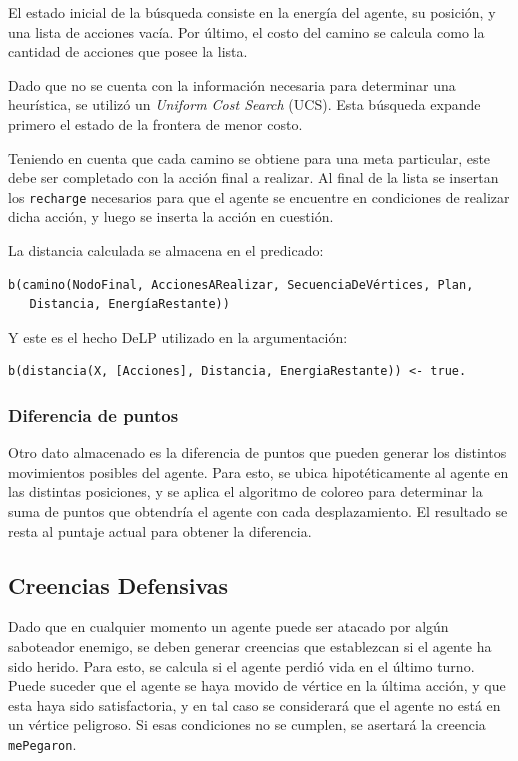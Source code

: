 \documentclass[oneside]{book}
\theoremstyle{definition}
\theoremstyle{example}
\begin{document}
El estado inicial de la búsqueda consiste en la energía del agente, su posición, y una 
lista de acciones vacía. Por último, el costo del camino se calcula como la cantidad de 
acciones que posee la lista.

Dado que no se cuenta con la información necesaria para determinar una heurística, se 
utilizó un \textit{Uniform Cost Search} (UCS). Esta búsqueda expande primero el estado
de la frontera de menor costo.

Teniendo en cuenta que cada camino se obtiene para una meta particular, este debe ser
completado con la acción final a realizar. Al final de la lista se insertan los 
\texttt{recharge} necesarios para que el agente se encuentre en condiciones de realizar 
dicha acción, y luego se inserta la acción en cuestión.

La distancia calculada se almacena en el predicado:

\begin{verbatim}
b(camino(NodoFinal, AccionesARealizar, SecuenciaDeVértices, Plan, 
   Distancia, EnergíaRestante))
\end{verbatim}

Y este es el hecho DeLP utilizado en la argumentación:

\begin{verbatim}
b(distancia(X, [Acciones], Distancia, EnergiaRestante)) <- true.
\end{verbatim}

\subsubsection{Diferencia de puntos}

Otro dato almacenado es la diferencia de puntos que pueden generar los distintos
movimientos posibles del agente. Para esto, se ubica hipotéticamente al agente
en las distintas posiciones, y se aplica el algoritmo de coloreo para determinar
la suma de puntos que obtendría el agente con cada desplazamiento. El resultado
se resta al puntaje actual para obtener la diferencia.

\subsection{Creencias Defensivas}

Dado que en cualquier momento un agente puede ser atacado por algún saboteador 
enemigo, se deben generar creencias que establezcan si el agente ha sido herido.
Para esto, se calcula si el agente perdió vida en el último turno. Puede suceder
que el agente se haya movido de vértice en la última acción, y que esta haya sido
satisfactoria, y en tal caso se considerará que el agente no está en un vértice
peligroso. Si esas condiciones no se cumplen, se asertará la creencia 
\texttt{mePegaron}.
\end{document}
